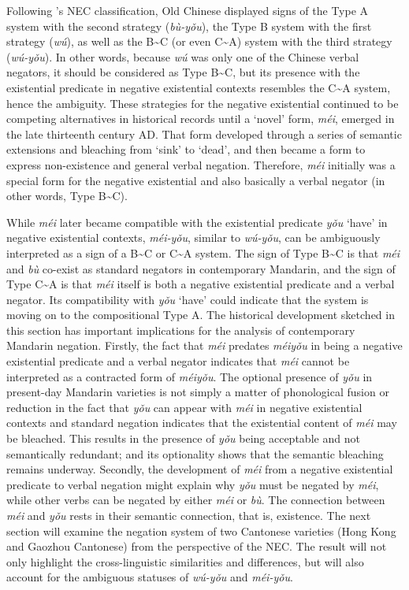 \documentclass[output=paper]{langscibook}
\begin{document}
Following \citeauthor{Croft1991}'s NEC classification, Old Chinese displayed signs of the Type A system with the second strategy (\textit{bù-yǒu}), the Type B system with the first strategy (\textit{wú}), as well as the B\sim C (or even C\sim A) system with the third strategy (\textit{wú-yǒu}). In other words, because \textit{wú} was only one of the Chinese verbal negators, it should be considered as Type B\sim C, but its presence with the existential predicate in negative existential contexts resembles the C\sim A system, hence the ambiguity. These strategies for the negative existential continued to be competing alternatives in historical records until a `novel' form, \textit{méi}, emerged in the late thirteenth century AD. That form developed through a series of semantic extensions and bleaching from `sink' to `dead', and then became a form to express non-existence and general verbal negation. Therefore, \textit{méi} initially was a special form for the negative existential and also basically a verbal negator (in other words, Type B\sim C). 

While \textit{méi} later became compatible with the existential predicate \textit{yǒu} `have' in negative existential contexts, \textit{méi-yǒu}, similar to \textit{wú-yǒu}, can be ambiguously interpreted as a sign of a B\sim C or C\sim A system. The sign of Type B\sim C is that \textit{méi} and \textit{bù} co-exist as standard negators in contemporary Mandarin, and the sign of Type C\sim A is that \textit{méi} itself is both a negative existential predicate and a verbal negator. Its compatibility with \textit{yǒu} `have' could indicate that the system is moving on to the compositional Type A. The historical development sketched in this section has important implications for the analysis of contemporary Mandarin negation. Firstly, the fact that \textit{méi} predates \textit{méiyǒu} in being a negative existential predicate and a verbal negator indicates that \textit{méi} cannot be interpreted as a contracted form of \textit{méiyǒu}. The optional presence of \textit{yǒu} in present-day Mandarin varieties is not simply a matter of phonological fusion or reduction in the fact that \textit{yǒu} can appear with \textit{méi} in negative existential contexts and standard negation indicates that the existential content of \textit{méi} may be bleached. This results in the presence of \textit{yǒu} being acceptable and not semantically redundant; and its optionality shows that the semantic bleaching remains underway. Secondly, the development of \textit{méi} from a negative existential predicate to verbal negation might explain why \textit{yǒu} must be negated by \textit{méi}, while other verbs can be negated by either \textit{méi} or \textit{bù}. The connection between \textit{méi} and \textit{yǒu} rests in their semantic connection, that is, existence. The next section will examine the negation system of two Cantonese varieties (Hong Kong and Gaozhou Cantonese) from the perspective of the NEC. The result will not only highlight the cross-linguistic similarities and differences, but will also account for the ambiguous statuses of \textit{wú-yǒu} and \textit{méi-yǒu}. 
\end{document}
